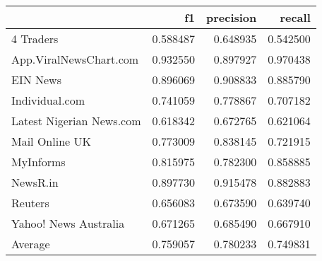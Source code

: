 \begin{tabular}{lrrr}
\toprule
{} &        f1 &  precision &    recall \\
\midrule
4 Traders                &  0.588487 &   0.648935 &  0.542500 \\
App.ViralNewsChart.com   &  0.932550 &   0.897927 &  0.970438 \\
EIN News                 &  0.896069 &   0.908833 &  0.885790 \\
Individual.com           &  0.741059 &   0.778867 &  0.707182 \\
Latest Nigerian News.com &  0.618342 &   0.672765 &  0.621064 \\
Mail Online UK           &  0.773009 &   0.838145 &  0.721915 \\
MyInforms                &  0.815975 &   0.782300 &  0.858885 \\
NewsR.in                 &  0.897730 &   0.915478 &  0.882883 \\
Reuters                  &  0.656083 &   0.673590 &  0.639740 \\
Yahoo! News Australia    &  0.671265 &   0.685490 &  0.667910 \\
Average                  &  0.759057 &   0.780233 &  0.749831 \\
\bottomrule
\end{tabular}
